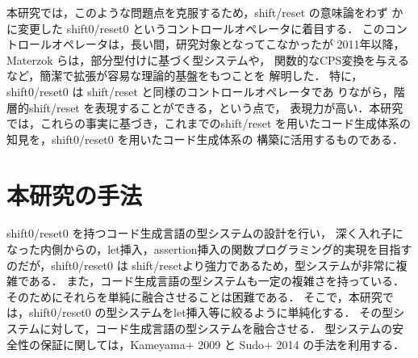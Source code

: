 \documentclass[10pt,a4j,xcolor=dvipsnames,twocolumn]{jarticle}
\theoremstyle{definition}
\begin{document}
本研究では，このような問題点を克服するため，shift/reset の意味論をわず
かに変更した shift0/reset0 というコントロールオペレータに着目する．
このコントロールオペレータは，長い間，研究対象となってこなかったが
2011年以降，Materzok らは，部分型付けに基づく型システムや，
関数的なCPS変換を与えるなど，簡潔で拡張が容易な理論的基盤をもつことを
解明した\cite{Materzok2011,materzok2012}．
特に，shift0/reset0 は shift/reset と同様のコントロールオペレータであ
りながら，階層的shift/reset を表現することができる，という点で，
表現力が高い．本研究では，これらの事実に基づき，これまでのshift/reset
を用いたコード生成体系の知見を，shift0/reset0 を用いたコード生成体系の
構築に活用するものである．




\section{本研究の手法}
shift0/reset0 を持つコード生成言語の型システムの設計を行い，
深く入れ子になった内側からの，let挿入，assertion挿入の関数プログラミング的実現を目指すのだが，shift0/reset0 は shift/resetより強力であるため，型システムが非常に複雑である．
また，コード生成言語の型システムも一定の複雑さを持っている．
そのためにそれらを単純に融合させることは困難である．
そこで，本研究では，shift0/reset0 の型システムをlet挿入等に絞るように単純化する．
その型システムに対して，コード生成言語の型システムを融合させる．
型システムの安全性の保証に関しては，Kameyama+ 2009\cite{Kameyama2009} と Sudo+ 2014\cite{Sudo2014} の手法を利用する．

\end{document}
